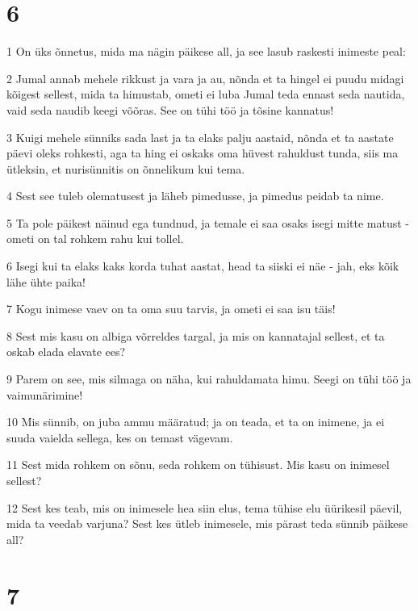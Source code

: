 \chapter{6}

\par 1 On üks õnnetus, mida ma nägin päikese all, ja see lasub raskesti inimeste peal:
\par 2 Jumal annab mehele rikkust ja vara ja au, nõnda et ta hingel ei puudu midagi kõigest sellest, mida ta himustab, ometi ei luba Jumal teda ennast seda nautida, vaid seda naudib keegi võõras. See on tühi töö ja tõsine kannatus!
\par 3 Kuigi mehele sünniks sada last ja ta elaks palju aastaid, nõnda et ta aastate päevi oleks rohkesti, aga ta hing ei oskaks oma hüvest rahuldust tunda, siis ma ütleksin, et nurisünnitis on õnnelikum kui tema.
\par 4 Sest see tuleb olematusest ja läheb pimedusse, ja pimedus peidab ta nime.
\par 5 Ta pole päikest näinud ega tundnud, ja temale ei saa osaks isegi mitte matust - ometi on tal rohkem rahu kui tollel.
\par 6 Isegi kui ta elaks kaks korda tuhat aastat, head ta siiski ei näe - jah, eks kõik lähe ühte paika!
\par 7 Kogu inimese vaev on ta oma suu tarvis, ja ometi ei saa isu täis!
\par 8 Sest mis kasu on albiga võrreldes targal, ja mis on kannatajal sellest, et ta oskab elada elavate ees?
\par 9 Parem on see, mis silmaga on näha, kui rahuldamata himu. Seegi on tühi töö ja vaimunärimine!
\par 10 Mis sünnib, on juba ammu määratud; ja on teada, et ta on inimene, ja ei suuda vaielda sellega, kes on temast vägevam.
\par 11 Sest mida rohkem on sõnu, seda rohkem on tühisust. Mis kasu on inimesel sellest?
\par 12 Sest kes teab, mis on inimesele hea siin elus, tema tühise elu üürikesil päevil, mida ta veedab varjuna? Sest kes ütleb inimesele, mis pärast teda sünnib päikese all?

\chapter{7}

